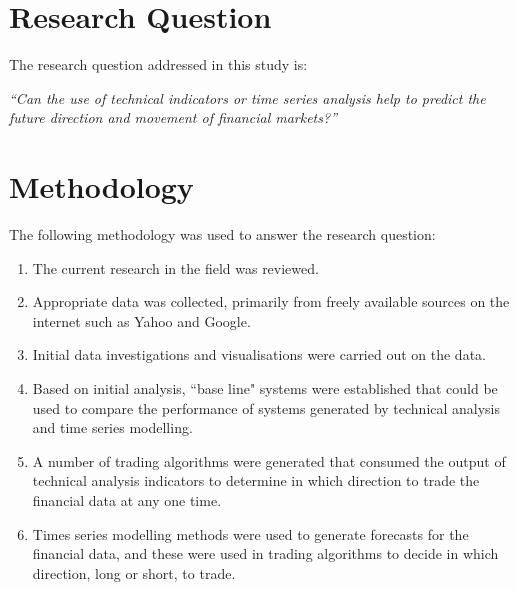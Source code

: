 

\section{Research Question}
The research question addressed in this study is: 

\textit{\textquotedblleft Can the use of technical indicators or time series analysis help to predict the future direction and movement of financial markets?\textquotedblright}

\section{Methodology}
The following methodology was used to answer the research question:

\begin{enumerate}
\item The current research in the field was reviewed.
\item Appropriate data was collected, primarily from freely available sources on the internet such as Yahoo and Google.
\item Initial data investigations and visualisations were carried out on the data.
\item Based on initial analysis, \textquotedblleft base line" systems were established that could be used to compare the performance of systems generated by technical analysis and time series modelling.
\item A number of trading algorithms were generated that consumed the output of technical analysis indicators to determine in which direction to trade the financial data at any one time.
\item Times series modelling methods were used to generate forecasts for the financial data, and these were used in trading algorithms to decide in which direction, long or short, to trade.
\end{enumerate}


